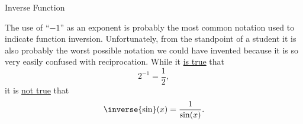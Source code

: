 \begin{mynotation}{Inverse Function}









  The use of ``$-1$'' as an exponent is probably the most common
  notation used to indicate function inversion. Unfortunately, from the
  standpoint of a student it is also probably the worst possible
  notation we could have invented because it is so very easily confused
  with reciprocation. While it \underline{\alert{is true}} that
  $$2^{-1} = \frac12,$$  it is \underline{\alert{not true}} that
  $$\inverse{\sin}(x) = \frac{1}{\sin(x)}.$$


\end{mynotation}
